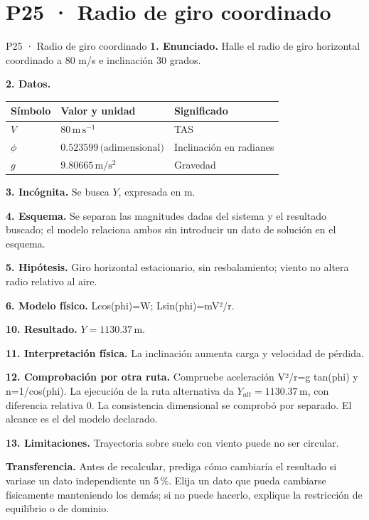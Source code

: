 \chapter*{P25 · Radio de giro coordinado}
\begin{studiumworked}{P25 · Radio de giro coordinado}
\textbf{1. Enunciado.} Halle el radio de giro horizontal coordinado a 80 m/s e inclinación 30 grados.

\textbf{2. Datos.}
\begin{longtable}{p{.16\linewidth}p{.35\linewidth}p{.38\linewidth}}\toprule Símbolo & Valor y unidad & Significado\\\midrule\endhead
$V$ & $80\,\mathrm{m\,s^{-1}}$ & TAS\\
$\phi$ & $0.523599\,\text{(adimensional)}$ & Inclinación en radianes\\
$g$ & $9.80665\,\mathrm{m/s^2}$ & Gravedad\\
\bottomrule\end{longtable}
\textbf{3. Incógnita.} Se busca $Y$, expresada en $\mathrm m$.

\textbf{4. Esquema.} Se separan las magnitudes dadas del sistema y el resultado buscado; el modelo relaciona ambos sin introducir un dato de solución en el esquema.

\textbf{5. Hipótesis.} Giro horizontal estacionario, sin resbalamiento; viento no altera radio relativo al aire.

\textbf{6. Modelo físico.} Lcos(phi)=W; Lsin(phi)=mV²/r.


\textbf{10. Resultado.} $Y=1130.37\,\mathrm m$.

\textbf{11. Interpretación física.} La inclinación aumenta carga y velocidad de pérdida.

\textbf{12. Comprobación por otra ruta.} Compruebe aceleración V²/r=g tan(phi) y n=1/cos(phi). La ejecución de la ruta alternativa da $Y_{alt}=1130.37\,\mathrm m$, con diferencia relativa $0$. La consistencia dimensional se comprobó por separado. El alcance es el del modelo declarado.

\textbf{13. Limitaciones.} Trayectoria sobre suelo con viento puede no ser circular.

\textbf{Transferencia.} Antes de recalcular, prediga cómo cambiaría el resultado si variase un dato independiente un 5\,\%. Elija un dato que pueda cambiarse físicamente manteniendo los demás; si no puede hacerlo, explique la restricción de equilibrio o de dominio.\par
\end{studiumworked}
